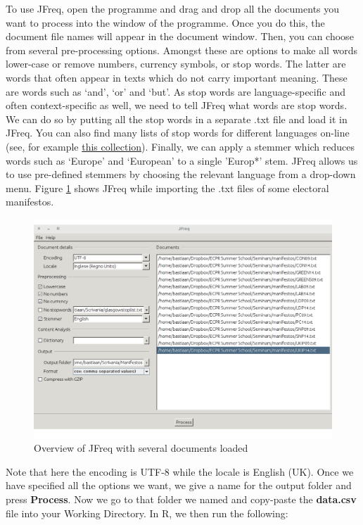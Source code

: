 \documentclass[
]{book}
\begin{document}
To use JFreq, open the programme and drag and drop all the documents you want to process into the window of the programme. Once you do this, the document file names will appear in the document window. Then, you can choose from several pre-processing options. Amongst these are options to make all words lower-case or remove numbers, currency symbols, or stop words. The latter are words that often appear in texts which do not carry important meaning. These are words such as `and', `or' and `but'. As stop words are language-specific and often context-specific as well, we need to tell JFreq what words are stop words. We can do so by putting all the stop words in a separate .txt file and load it in JFreq. You can also find many lists of stop words for different languages on-line (see, for example \href{https://github.com/igorbrigadir/stopwords}{this collection}). Finally, we can apply a stemmer which reduces words such as `Europe' and `European' to a single 'Europ*' stem. JFreq allows us to use pre-defined stemmers by choosing the relevant language from a drop-down menu. Figure \ref{fig:figure-jfreq} shows JFreq while importing the .txt files of some electoral manifestos.

\hfill\break

\begin{figure}
\includegraphics[width=1\linewidth]{figures/jfreq} \caption{Overview of JFreq with several documents loaded}\label{fig:figure-jfreq}
\end{figure}

\hfill\break

Note that here the encoding is UTF-8 while the locale is English (UK). Once we have specified all the options we want, we give a name for the output folder and press \textbf{Process}. Now we go to that folder we named and copy-paste the \textbf{data.csv} file into your Working Directory. In R, we then run the following:
\end{document}
